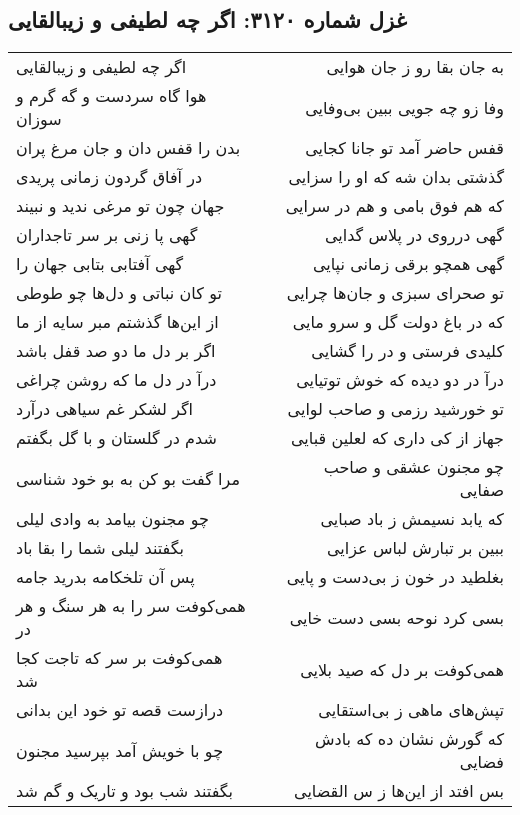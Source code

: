 \begin{center}
\section*{غزل شماره ۳۱۲۰: اگر چه لطیفی و زیبالقایی}
\label{sec:3120}
\begin{longtable}{l p{0.5cm} r}
اگر چه لطیفی و زیبالقایی
&&
به جان بقا رو ز جان هوایی
\\
هوا گاه سردست و گه گرم و سوزان
&&
وفا زو چه جویی ببین بی‌وفایی
\\
بدن را قفس دان و جان مرغ پران
&&
قفس حاضر آمد تو جانا کجایی
\\
در آفاق گردون زمانی پریدی
&&
گذشتی بدان شه که او را سزایی
\\
جهان چون تو مرغی ندید و نبیند
&&
که هم فوق بامی و هم در سرایی
\\
گهی پا زنی بر سر تاجداران
&&
گهی درروی در پلاس گدایی
\\
گهی آفتابی بتابی جهان را
&&
گهی همچو برقی زمانی نپایی
\\
تو کان نباتی و دل‌ها چو طوطی
&&
تو صحرای سبزی و جان‌ها چرایی
\\
از این‌ها گذشتم مبر سایه از ما
&&
که در باغ دولت گل و سرو مایی
\\
اگر بر دل ما دو صد قفل باشد
&&
کلیدی فرستی و در را گشایی
\\
درآ در دل ما که روشن چراغی
&&
درآ در دو دیده که خوش توتیایی
\\
اگر لشکر غم سیاهی درآرد
&&
تو خورشید رزمی و صاحب لوایی
\\
شدم در گلستان و با گل بگفتم
&&
جهاز از کی داری که لعلین قبایی
\\
مرا گفت بو کن به بو خود شناسی
&&
چو مجنون عشقی و صاحب صفایی
\\
چو مجنون بیامد به وادی لیلی
&&
که یابد نسیمش ز باد صبایی
\\
بگفتند لیلی شما را بقا باد
&&
ببین بر تبارش لباس عزایی
\\
پس آن تلخکامه بدرید جامه
&&
بغلطید در خون ز بی‌دست و پایی
\\
همی‌کوفت سر را به هر سنگ و هر در
&&
بسی کرد نوحه بسی دست خایی
\\
همی‌کوفت بر سر که تاجت کجا شد
&&
همی‌کوفت بر دل که صید بلایی
\\
درازست قصه تو خود این بدانی
&&
تپش‌های ماهی ز بی‌استقایی
\\
چو با خویش آمد بپرسید مجنون
&&
که گورش نشان ده که بادش فضایی
\\
بگفتند شب بود و تاریک و گم شد
&&
بس افتد از این‌ها ز س القضایی

\end{longtable}
\end{center}
